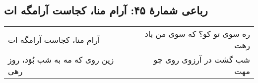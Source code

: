 \begin{center}
\section*{رباعی شمارهٔ ۴۵: آرام منا، کجاست آرامگه ات}
\label{sec:045}
\begin{longtable}{l p{0.5cm} r}
آرام منا، کجاست آرامگه ات
&&
ره سوی تو کو؟ که سوی من باد رهت
\\
زین روی که مه به شب بُوَد، روز رهی
&&
شب گشت در آرزوی روی چو مهت
\\
\end{longtable}
\end{center}

